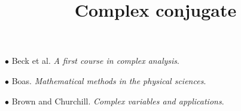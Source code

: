 \documentclass[11pt, oneside]{article}
\title{Complex conjugate}
\date{}
\begin{document}
\maketitle
\Large


$\bullet$ Beck et al.  \emph{A first course in complex analysis}.

$\bullet$ Boas.  \emph{Mathematical methods in the physical sciences}.

$\bullet$ Brown and Churchill.  \emph{Complex variables and applications}.
\end{document}

